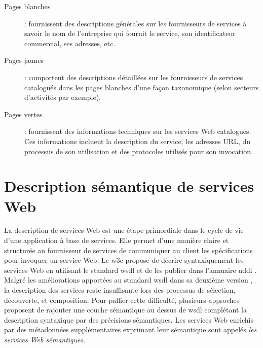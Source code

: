   \renewcommand{\descriptionlabel}[1]{\hspace{0.5cm}\textbullet~\textsf{#1}}
  \begin{description}
    \item[Pages blanches]: fournissent des descriptions générales sur
      les fournisseurs de services à savoir le nom de l'entreprise qui
      fournit le service, son identificateur commercial, ses adresses,
      etc.

    \item[Pages jaunes]: comportent des descriptions détaillées sur
      les fournisseurs de services catalogués dans les pages blanches
      d'une façon taxonomique (selon secteurs d'activités par
      exemple).

    \item[Pages vertes]: fournissent des informations techniques sur
      les services Web catalogués. Ces informations incluent la
      description du service, les adresses \textsc{URL}, du processus
      de son utilisation et des protocoles utilisés pour son
      invocation.
  \end{description}

\section{Description sémantique de services Web}
\label{sec:ws-description}
La description de services Web est une étape primordiale dans
le cycle de vie d'une application à base de services. Elle permet
d'une manière claire et structurée au fournisseur de services
de communiquer au client les spécifications pour invoquer un service
Web. Le \acrshort{w3c} propose de décrire syntaxiquement les services
Web en utilisant le standard \acrshort{wsdl} \cite{christensen2001web,
  chinnici2007web} et de les publier dans l'annuaire \acrshort{uddi}
\cite{clement2004uddi}. Malgré les améliorations apportées au standard
\acrshort{wsdl} dans sa deuxième version \cite{chinnici2007web}, la
description des services reste insuffisante lors des processus de
sélection, découverte, et composition. Pour pallier cette
difficulté, plusieurs approches \cite{sivashanmugam2003adding,
  mcilraith2001semantic, mcilraith2003bringing, fensel2002web,
  paolucci2002semantic} proposent de rajouter une couche sémantique au
dessus de \acrshort{wsdl} complétant la description syntaxique par des
précisions sémantiques. Les services Web enrichis par des métadonnées
supplémentaires exprimant leur sémantique sont appelés \textit{les
services Web sémantiques}.\medskip

